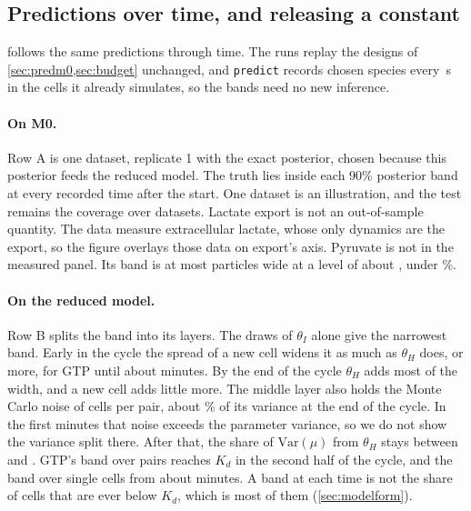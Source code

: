 \subsection{Predictions over time, and releasing a constant}
\label{sec:trajectories}

 follows the same predictions through time. The runs replay the designs of
\cref{sec:predm0,sec:budget} unchanged, and \texttt{predict} records chosen species every
\,s in the cells it already simulates, so the bands need no new inference.

\paragraph{On M0.} Row A is one dataset, replicate 1 with the exact posterior, chosen
because this posterior feeds the reduced model. The truth lies inside each 90\% posterior band
at every recorded time after the start. One dataset is an illustration, and the test remains the
coverage over  datasets. Lactate export is not an out-of-sample quantity. The data
measure extracellular lactate, whose only dynamics are the export, so the figure overlays those data
on export's axis. Pyruvate is not in the measured panel. Its band is at most  particles wide at a level of about
, under \%.

\paragraph{On the reduced model.} Row B splits the band into its layers. The draws of $\theta_I$
alone give the narrowest band. Early in the cycle the spread of a new cell widens it as much as
$\theta_H$ does, or more, for GTP until about  minutes. By the end of the
cycle $\theta_H$ adds most of the width, and a new cell adds little more. The middle layer also holds the Monte Carlo noise of  cells per
pair, about \% of its variance at the end of the cycle. In the first 
minutes that noise exceeds the parameter variance, so we do not show the variance split there.
After that, the share of $\mathrm{Var}(\mu)$ from $\theta_H$ stays between  and
. GTP's band over pairs reaches $K_d$ in the second half of the cycle, and the band
over single cells from about  minutes. A band at each time is not the share of
cells that are ever below $K_d$, which is most of them (\cref{sec:modelform}).


